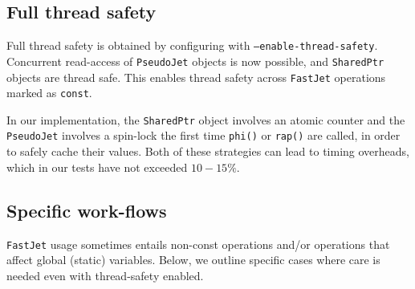 \documentclass[12pt,a4]{article}
\newcommand{\fastjet}{\texttt{FastJet}\xspace}
\newcommand{\ttt}[1]{{\small\texttt{#1}}}
\begin{document}
\subsection{Full thread safety}
\label{sec:full-thread-safety}

Full thread safety is obtained by configuring with
\ttt{--enable-thread-safety}.
%
Concurrent read-access of \ttt{PseudoJet} objects is now possible,
and \ttt{SharedPtr} objects are thread safe.
%
This enables thread safety across \fastjet operations marked as
\ttt{const}.

In our implementation, the \ttt{SharedPtr} object involves an atomic
counter and the \ttt{PseudoJet} involves a spin-lock the first time
\ttt{phi()} or \ttt{rap()} are called, in order to safely cache their
values.
%
Both of these strategies can lead to timing overheads, which in our
tests have not exceeded $10{-}15\%$. 

\subsection{Specific work-flows}
\label{sec:thread-safety-workflows}

\fastjet usage sometimes entails non-const operations and/or
operations that affect global (static) variables.
%
Below, we outline specific cases where care is needed even with
thread-safety enabled.

\end{document}

